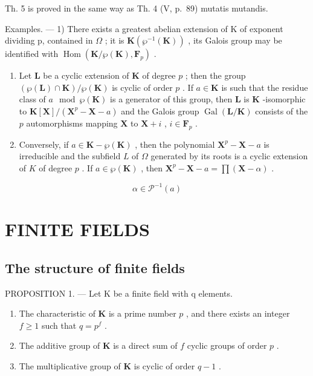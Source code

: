 Th. 5 is proved in the same way as Th. 4 (V, p.~89) mutatis mutandis.

Examples. --- 1) There exists a greatest abelian extension of K of exponent dividing p, contained in \(\Omega\) ; it is \(\mathbf{K}(\wp^{-1}(\mathbf{K}))\) , its Galois group may be identified with \(\operatorname{Hom}(\mathbf{K}/\wp(\mathbf{K}), \mathbf{F}_{p})\) .

\begin{enumerate}
\def\labelenumi{\arabic{enumi})}
\setcounter{enumi}{1}
\item
  Let \(\mathbf{L}\) be a cyclic extension of \(\mathbf{K}\) of degree \(p\) ; then the group \((\wp(\mathbf{L}) \cap \mathbf{K}) / \wp(\mathbf{K})\) is cyclic of order \(p\) . If \(a \in \mathbf{K}\) is such that the residue class of \(a \mod \wp(\mathbf{K})\) is a generator of this group, then \(\mathbf{L}\) is \(\mathbf{K}\) -isomorphic to \(\mathbf{K}[\mathbf{X}] / (\mathbf{X}^p - \mathbf{X} - a)\) and the Galois group \(\operatorname{Gal}(\mathbf{L} / \mathbf{K})\) consists of the \(p\) automorphisms mapping \(\mathbf{X}\) to \(\mathbf{X} + i\) , \(i \in \mathbf{F}_p\) .
\item
  Conversely, if \(a \in \mathbf{K} - \wp(\mathbf{K})\) , then the polynomial \(\mathbf{X}^p - \mathbf{X} - a\) is irreducible and the subfield \(L\) of \(\Omega\) generated by its roots is a cyclic extension of \(K\) of degree \(p\) . If \(a \in \wp(\mathbf{K})\) , then \(\mathbf{X}^p - \mathbf{X} - a = \prod (\mathbf{X} - \alpha)\) .
\end{enumerate}

\[
\alpha \in \mathcal {P} ^ {- 1} (a)
\]

\section{FINITE FIELDS}

\subsection{The structure of finite fields}

PROPOSITION 1. --- Let K be a finite field with q elements.

\begin{enumerate}
\def\labelenumi{\alph{enumi})}
\item
  The characteristic of \(\mathbf{K}\) is a prime number \(p\) , and there exists an integer \(f \geqslant 1\) such that \(q = p^f\) .
\item
  The additive group of \(\mathbf{K}\) is a direct sum of \(f\) cyclic groups of order \(p\) .
\item
  The multiplicative group of \(\mathbf{K}\) is cyclic of order \(q - 1\) .
\end{enumerate}

